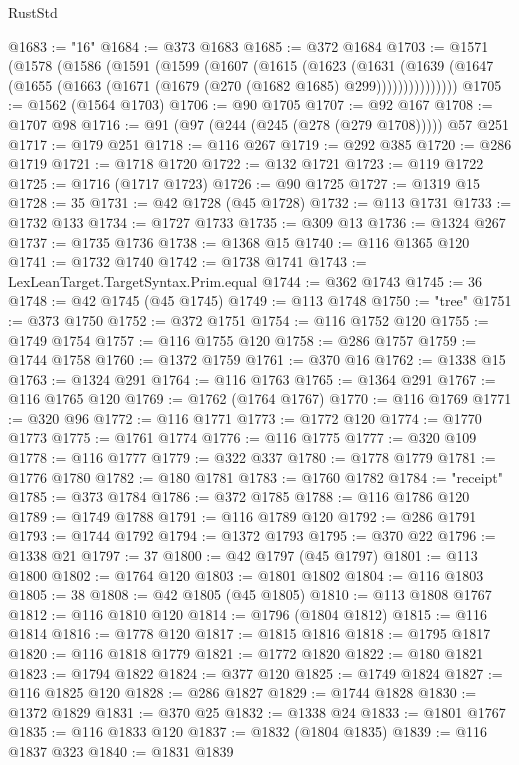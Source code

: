 \begin{lexlean}{RustStd}
\begin{coremodule}
@1683 := "16"
@1684 := @373 @1683
@1685 := @372 @1684
@1703 := @1571
    (@1578
      (@1586
        (@1591
          (@1599
            (@1607
              (@1615
                (@1623
                  (@1631
                    (@1639
                      (@1647 (@1655 (@1663 (@1671 (@1679 (@270 (@1682 @1685) @299)))))))))))))))
@1705 := @1562 (@1564 @1703)
@1706 := @90 @1705
@1707 := @92 @167
@1708 := @1707 @98
@1716 := @91 (@97 (@244 (@245 (@278 (@279 @1708))))) @57 @251
@1717 := @179 @251
@1718 := @116 @267
@1719 := @292 @385
@1720 := @286 @1719
@1721 := @1718 @1720
@1722 := @132 @1721
@1723 := @119 @1722
@1725 := @1716 (@1717 @1723)
@1726 := @90 @1725
@1727 := @1319 @15
@1728 := 35
@1731 := @42 @1728 (@45 @1728)
@1732 := @113 @1731
@1733 := @1732 @133
@1734 := @1727 @1733
@1735 := @309 @13
@1736 := @1324 @267
@1737 := @1735 @1736
@1738 := @1368 @15
@1740 := @116 @1365 @120
@1741 := @1732 @1740
@1742 := @1738 @1741
@1743 := LexLeanTarget.TargetSyntax.Prim.equal
@1744 := @362 @1743
@1745 := 36
@1748 := @42 @1745 (@45 @1745)
@1749 := @113 @1748
@1750 := "tree"
@1751 := @373 @1750
@1752 := @372 @1751
@1754 := @116 @1752 @120
@1755 := @1749 @1754
@1757 := @116 @1755 @120
@1758 := @286 @1757
@1759 := @1744 @1758
@1760 := @1372 @1759
@1761 := @370 @16
@1762 := @1338 @15
@1763 := @1324 @291
@1764 := @116 @1763
@1765 := @1364 @291
@1767 := @116 @1765 @120
@1769 := @1762 (@1764 @1767)
@1770 := @116 @1769
@1771 := @320 @96
@1772 := @116 @1771
@1773 := @1772 @120
@1774 := @1770 @1773
@1775 := @1761 @1774
@1776 := @116 @1775
@1777 := @320 @109
@1778 := @116 @1777
@1779 := @322 @337
@1780 := @1778 @1779
@1781 := @1776 @1780
@1782 := @180 @1781
@1783 := @1760 @1782
@1784 := "receipt"
@1785 := @373 @1784
@1786 := @372 @1785
@1788 := @116 @1786 @120
@1789 := @1749 @1788
@1791 := @116 @1789 @120
@1792 := @286 @1791
@1793 := @1744 @1792
@1794 := @1372 @1793
@1795 := @370 @22
@1796 := @1338 @21
@1797 := 37
@1800 := @42 @1797 (@45 @1797)
@1801 := @113 @1800
@1802 := @1764 @120
@1803 := @1801 @1802
@1804 := @116 @1803
@1805 := 38
@1808 := @42 @1805 (@45 @1805)
@1810 := @113 @1808 @1767
@1812 := @116 @1810 @120
@1814 := @1796 (@1804 @1812)
@1815 := @116 @1814
@1816 := @1778 @120
@1817 := @1815 @1816
@1818 := @1795 @1817
@1820 := @116 @1818 @1779
@1821 := @1772 @1820
@1822 := @180 @1821
@1823 := @1794 @1822
@1824 := @377 @120
@1825 := @1749 @1824
@1827 := @116 @1825 @120
@1828 := @286 @1827
@1829 := @1744 @1828
@1830 := @1372 @1829
@1831 := @370 @25
@1832 := @1338 @24
@1833 := @1801 @1767
@1835 := @116 @1833 @120
@1837 := @1832 (@1804 @1835)
@1839 := @116 @1837 @323
@1840 := @1831 @1839

\end{coremodule}
\end{lexlean}
